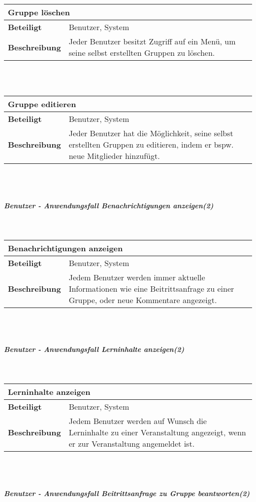 \documentclass[12pt,a4paper]{article}
\begin{document}
\begin{tabular}{l p{10cm}}
\multicolumn{2}{l}{\textbf{Gruppe löschen}} \\ \hline
\textbf{Beteiligt} & Benutzer, System \\ \hline 
\textbf{Beschreibung} & Jeder Benutzer besitzt Zugriff auf ein Menü, um seine selbst erstellten Gruppen zu löschen.\\ 
\hline 
\end{tabular}\\\\

\begin{tabular}{l p{10cm}}
\multicolumn{2}{l}{\textbf{Gruppe editieren}} \\ \hline
\textbf{Beteiligt} & Benutzer, System \\ \hline 
\textbf{Beschreibung} & Jeder Benutzer hat die Möglichkeit, seine selbst erstellten Gruppen zu editieren, indem er bspw. neue Mitglieder hinzufügt.\\ 
\hline 
\end{tabular}\\\\
\subparagraph{Benutzer - Anwendungsfall \glqq Benachrichtigungen anzeigen\grqq  (2)}\mbox{}\\

\begin{tabular}{l p{10cm}}
\multicolumn{2}{l}{\textbf{Benachrichtigungen anzeigen}} \\ \hline
\textbf{Beteiligt} & Benutzer, System \\ \hline 
\textbf{Beschreibung} & Jedem Benutzer werden immer aktuelle Informationen wie eine Beitrittsanfrage zu einer Gruppe, oder neue Kommentare angezeigt.\\ 
\hline 
\end{tabular}\\\\
\subparagraph{Benutzer - Anwendungsfall \glqq Lerninhalte anzeigen\grqq  (2)}\mbox{}\\
\begin{tabular}{l p{10cm}}
\multicolumn{2}{l}{\textbf{Lerninhalte anzeigen}} \\ \hline
\textbf{Beteiligt} & Benutzer, System \\ \hline 
\textbf{Beschreibung} & Jedem Benutzer werden auf Wunsch die Lerninhalte zu einer Veranstaltung angezeigt, wenn er zur Veranstaltung angemeldet ist.\\ 
\hline 
\end{tabular}\\\\
\subparagraph{Benutzer - Anwendungsfall \glqq Beitrittsanfrage zu Gruppe beantworten\grqq (2)}\mbox{}\\
\end{document}
